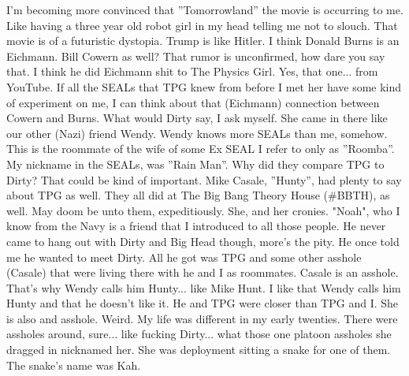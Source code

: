 \documentclass{article}
\begin{document}
\begin{multicols}{2}
I'm becoming more convinced that ''Tomorrowland'' the movie is occurring to me. Like having a three year old robot girl in my head telling me not to slouch. That movie is of a futuristic dystopia. Trump is like Hitler. I think Donald Burns is an Eichmann. Bill Cowern as well? That rumor is unconfirmed, how dare you say that. I think he did Eichmann shit to The Physics Girl. Yes, that one... from YouTube. If all the SEALs that TPG knew from before I met her have some kind of experiment on me, I can think about that (Eichmann) connection between Cowern and Burns. What would Dirty say, I ask myself. She came in there like our other (Nazi) friend Wendy. Wendy knows more SEALs than me, somehow. This is the roommate of the wife of some Ex SEAL I refer to only as ''Roomba''. My nickname in the SEALs, was ''Rain Man''. Why did they compare TPG to Dirty? That could be kind of important. Mike Casale, ''Hunty'', had plenty to say about TPG as well. They all did at The Big Bang Theory House (\#BBTH), as well. May doom be unto them, expeditiously. She, and her cronies. "Noah", who I know from the Navy is a friend that I introduced to all those people. He never came to hang out with Dirty and Big Head though, more's the pity. He once told me he wanted to meet Dirty. All he got was TPG and some other asshole (Casale) that were living there with he and I as roommates. Casale is an asshole. That's why Wendy calls him Hunty... like Mike Hunt. I like that Wendy calls him Hunty and that he doesn't like it. He and TPG were closer than TPG and I. She is also and asshole. Weird. My life was different in my early twenties. There were assholes around, sure... like fucking Dirty... what those one platoon assholes she dragged in nicknamed her. She was deployment sitting a snake for one of them. The snake's name was Kah.


\end{multicols}
\end{document}
